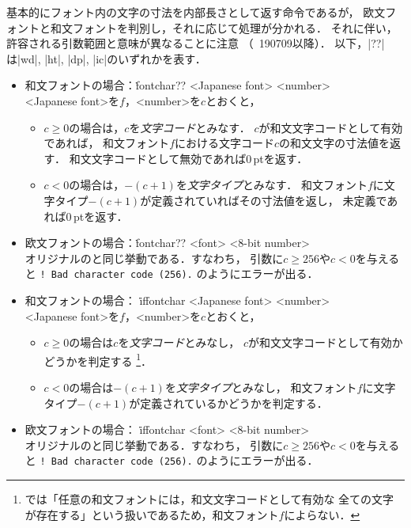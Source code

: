 \documentclass[a4paper,11pt,nomag,dvipdfmx]{jsarticle}
\begin{document}
\begin{cslist}
  基本的にフォント内の文字の寸法を内部長さとして返す命令であるが，
  欧文フォントと和文フォントを判別し，それに応じて処理が分かれる．
  それに伴い，許容される引数範囲と意味が異なることに注意
  （\epTeX~190709以降）．
  以下，|??|は|wd|, |ht|, |dp|, |ic|のいずれかを表す．
  \begin{itemize}
    \item 和文フォントの場合：\.{fontchar??} <Japanese font> <number>\\
      <Japanese font>を$f$，<number>を$c$とおくと，
      \begin{itemize}
        \item $c \geq 0$の場合は，$c$を\emph{文字コード}とみなす．
          $c$が和文文字コードとして有効であれば，
          和文フォント$f$における文字コード$c$の和文文字の寸法値を返す．
          和文文字コードとして無効であれば0\,ptを返す．
        \item $c < 0$の場合は，$-(c+1)$を\emph{文字タイプ}とみなす．
          和文フォント$f$に文字タイプ$-(c+1)$が定義されていればその寸法値を返し，
          未定義であれば0\,ptを返す．
      \end{itemize}
    \item 欧文フォントの場合：\.{fontchar??} <font> <8-bit number>\\
      オリジナルの\eTeX と同じ挙動である．すなわち，
      引数に$c \geq 256$や$c < 0$を与えると
      \verb+! Bad character code (256).+
      のようにエラーが出る．
  \end{itemize}

  \begin{itemize}
    \item 和文フォントの場合： \.{iffontchar} <Japanese font> <number>\\
      <Japanese font>を$f$，<number>を$c$とおくと，
      \begin{itemize}
        \item $c \geq 0$の場合は$c$を\emph{文字コード}とみなし，
          $c$が和文文字コードとして有効かどうかを判定する
          \footnote{\pTeX では「任意の和文フォントには，和文文字コードとして有効な
          全ての文字が存在する」という扱いであるため，和文フォント$f$によらない．}．
        \item $c < 0$の場合は$-(c+1)$を\emph{文字タイプ}とみなし，
          和文フォント$f$に文字タイプ$-(c+1)$が定義されているかどうかを判定する．
      \end{itemize}
    \item 欧文フォントの場合： \.{iffontchar} <font> <8-bit number>\\
      オリジナルの\eTeX と同じ挙動である．すなわち，
      引数に$c \geq 256$や$c < 0$を与えると
      \verb+! Bad character code (256).+
      のようにエラーが出る．
  \end{itemize}
\end{cslist}
\end{document}
